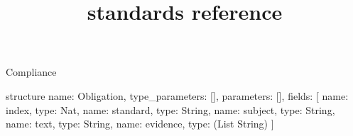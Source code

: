\begin{lexlean}{Compliance}
\title{standards reference}
\begin{semanticmodule}
structure{
  name: Obligation,
  type_parameters: [],
  parameters: [],
  fields: [
    {name: index, type: Nat},
    {name: standard, type: String},
    {name: subject, type: String},
    {name: text, type: String},
    {name: evidence, type: (List String)}
  ]
}


\end{semanticmodule}
\end{lexlean}
